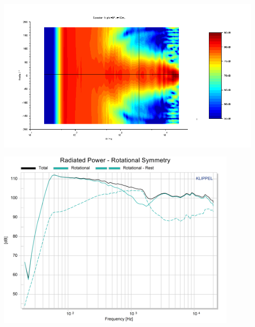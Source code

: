 \documentclass{report}
\begin{document}
\begin{appendices}
\begin{minipage}{0.5\textwidth}
\begin{center}
	\includegraphics[width=\textwidth]{Sym/contour_studio}
    \captionsetup{hypcap=false}
    \label{Curves:studio_zoom}
\end{center}
\end{minipage}
\begin{minipage}{0.5\textwidth}
\begin{center}
	\includegraphics[width=0.9\textwidth]{Sym/studio_RadPow_Rot}
    \captionsetup{hypcap=false}
    \label{Curves:studio_rot}
\end{center}
\end{minipage}


\end{appendices}
\end{document}
